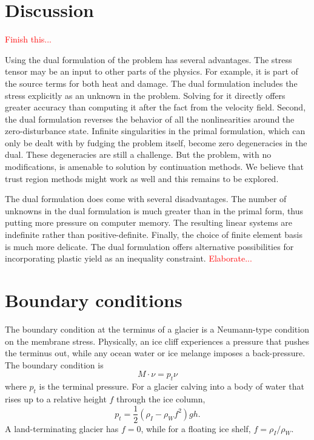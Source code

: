 \documentclass{article}
\theoremstyle{definition}
\theoremstyle{plain}
\begin{document}
\section{Discussion}

\textcolor{red}{Finish this...}

Using the dual formulation of the problem has several advantages.
The stress tensor may be an input to other parts of the physics.
For example, it is part of the source terms for both heat and damage.
The dual formulation includes the stress explicitly as an unknown in the problem.
Solving for it directly offers greater accuracy than computing it after the fact from the velocity field.
Second, the dual formulation reverses the behavior of all the nonlinearities around the zero-disturbance state.
Infinite singularities in the primal formulation, which can only be dealt with by fudging the problem itself, become zero degeneracies in the dual.
These degeneracies are still a challenge.
But the problem, with no modifications, is amenable to solution by continuation methods.
We believe that trust region methods might work as well and this remains to be explored.

The dual formulation does come with several disadvantages.
The number of unknowns in the dual formulation is much greater than in the primal form, thus putting more pressure on computer memory.
The resulting linear systems are indefinite rather than positive-definite.
Finally, the choice of finite element basis is much more delicate.
The dual formulation offers alternative possibilities for incorporating plastic yield as an inequality constraint.
\textcolor{red}{Elaborate...}


\appendix

\section{Boundary conditions} \label{sec:boundary-conditions}

The boundary condition at the terminus of a glacier is a Neumann-type condition on the membrane stress.
Physically, an ice cliff experiences a pressure that pushes the terminus out, while any ocean water or ice melange imposes a back-pressure.
The boundary condition is
\begin{equation}
    M\cdot\nu = p_t\nu
\end{equation}
where $p_t$ is the terminal pressure.
For a glacier calving into a body of water that rises up to a relative height $f$ through the ice column,
\begin{equation}
    p_t = \frac{1}{2}\left(\rho_I - \rho_Wf^2\right)gh.
\end{equation}
A land-terminating glacier has $f = 0$, while for a floating ice shelf, $f = \rho_I / \rho_W$.
\end{document}
